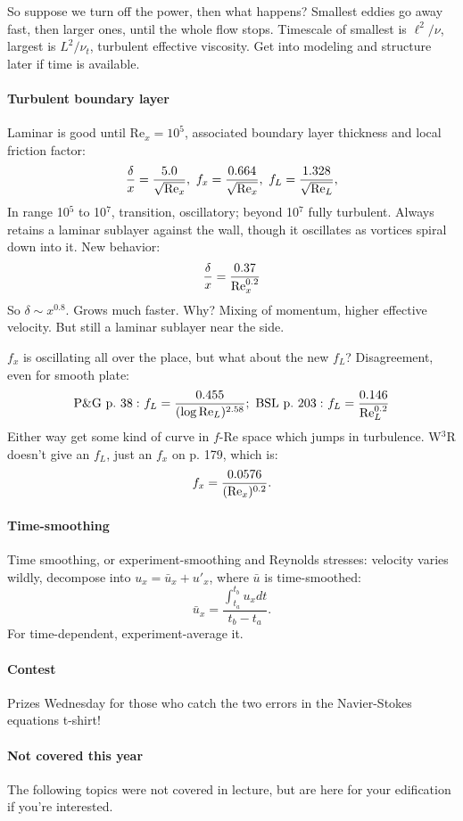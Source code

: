 \documentclass{report}
\begin{document}
So suppose we turn off the power, then what happens?  Smallest eddies go away
fast, then larger ones, until the whole flow stops.  Timescale of smallest is
$\ell^2/\nu$, largest is $L^2/\nu_t$, turbulent effective viscosity.  Get into
modeling and structure later if time is available.

\paragraph{Turbulent boundary layer}

Laminar is good until Re$_x=10^5$, associated boundary layer thickness and
local friction factor:
$$\frac{\delta}{x} = \frac{5.0}{\sqrt{{\rm Re}_x}},
\ f_x=\frac{0.664}{\sqrt{{\rm Re}_x}},
\ f_L=\frac{1.328}{\sqrt{{\rm Re}_L}},$$
In range 10$^5$ to 10$^7$, transition, oscillatory; beyond 10$^7$ fully
turbulent.  Always retains a laminar sublayer against the wall, though it
oscillates as vortices spiral down into it.  New behavior:
$$\frac{\delta}{x} = \frac{0.37}{{\rm Re}_x^{0.2}}$$
So $\delta\sim x^{0.8}$.  Grows much faster.  Why?  Mixing of momentum, higher
effective velocity.  But still a laminar sublayer near the side.

$f_x$ is oscillating all over the place, but what about the new $f_L$?
Disagreement, even for smooth plate:
$${\rm P\&G\ p.\ 38:}\ f_L=\frac{0.455}{(\log{\rm Re}_L)^{2.58}};
\ {\rm BSL\ p.\ 203:}\ f_L=\frac{0.146}{{\rm Re}_L^{0.2}}$$
Either way get some kind of curve in $f$-Re space which jumps in turbulence.
W$^3$R doesn't give an $f_L$, just an $f_x$ on p. 179, which is:
$$f_x=\frac{0.0576}{({\rm Re}_x)^{0.2}}.$$

\paragraph{Time-smoothing}

Time smoothing, or experiment-smoothing and Reynolds stresses: velocity varies
wildly, decompose into $u_x=\bar{u}_x + u'_x$, where $\bar{u}$ is
time-smoothed:
$$\bar{u}_x=\frac{\int_{t_a}^{t_b} u_x dt}{t_b-t_a}.$$
For time-dependent, experiment-average it.

\paragraph{Contest}

Prizes Wednesday for those who catch the two errors in the Navier-Stokes
equations t-shirt!

\paragraph{Not covered this year} The following topics were not covered in
lecture, but are here for your edification if you're interested.
\end{document}
